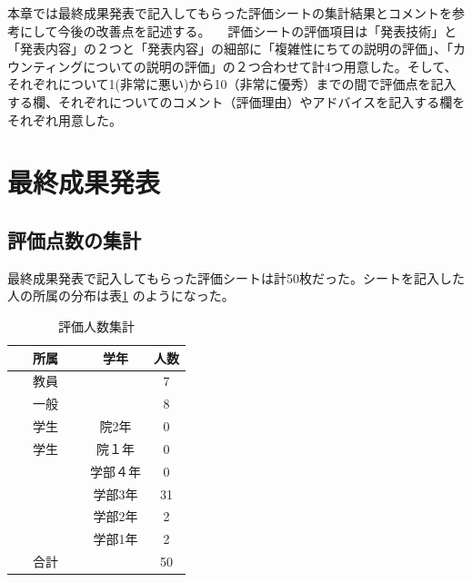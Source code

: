  本章では最終成果発表で記入してもらった評価シートの集計結果とコメントを参考にして今後の改善点を記述する。
　評価シートの評価項目は「発表技術」と「発表内容」の２つと「発表内容」の細部に「複雑性にちての説明の評価」、「カウンティングについての説明の評価」の２つ合わせて計4つ用意した。そして、それぞれについて1(非常に悪い)から10（非常に優秀）までの間で評価点を記入する欄、それぞれについてのコメント（評価理由）やアドバイスを記入する欄をそれぞれ用意した。
\section{最終成果発表}
\subsection{評価点数の集計}
最終成果発表で記入してもらった評価シートは計50枚だった。シートを記入した人の所属の分布は表\ref{tab:dist2} のようになった。

\begin{table}[htb]
  \begin{center}
    \caption{評価人数集計}
    \begin{tabular}{|c|c|c|} \hline 
      所属 & 学年 & 人数  \\ \hline \hline
      教員 &  & 7  \\
      一般 &  & 8 \\
      学生 & 院2年 & 0 \\
     学生 & 院１年 & 0 \\
             & 学部４年 & 0 \\
 　　　　　 & 学部3年 & 31 \\
             & 学部2年 & 2 \\
             & 学部1年 & 2 \\ \hline \hline
      合計 &  & 50 \\ \hline
    \end{tabular}
    \label{tab:dist2}
  \end{center}
\end{table}

